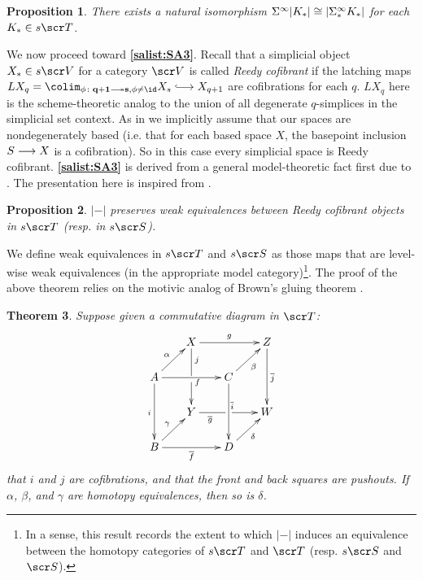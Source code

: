 \documentclass{amsart}
\newtheorem{thm}{Theorem}[section]
\newtheorem{prop}[thm]{Proposition}
\theoremstyle{definition}
\begin{document}
\begin{prop}\label{prop:3.2}
There exists a natural isomorphism $\Sigma^{\infty}|K_*| \cong |\Sigma^{\infty}_*K_*|$ for each $K_* \in s\sT$.
\end{prop}

We now proceed toward \textbf{\ref{salist:SA3}}. Recall that a simplicial object $X_* \in s\sV$ for a category $\sV$ is called \emph{Reedy cofibrant} if the latching maps $LX_q = \colim_{\phi \colon \mathbf{q+1} \epito \mathbf{s}, \phi \neq \id} X_s \monoto X_{q+1}$ are cofibrations for each $q$. $LX_q$ here is the scheme-theoretic analog to the union of all degenerate $q$-simplices in the simplicial set context. As in \cite{May09Einfty} we implicitly assume that our spaces are nondegenerately based (i.e. that for each based space $X$, the basepoint inclusion $S \longrightarrow X$ is a cofibration). So in this case every simplicial space is Reedy cofibrant.
\textbf{\ref{salist:SA3}} is derived from a general model-theoretic fact first due to \cite{reedy73}. The presentation here is inspired from \cite{may74perm}. 

\begin{prop}
$|-|$ preserves weak equivalences between Reedy cofibrant objects in $s\sT$ (resp. in $s\sS$).
\end{prop}

We define weak equivalences in $s\sT$ and $s\sS$ as those maps that are level-wise weak equivalences (in the appropriate model category)\footnote{In a sense, this result records the extent to which $|-|$ induces an equivalence between the homotopy categories of $s\sT$ and $\sT$ (resp. $s\sS$ and $\sS$).}. The proof of the above theorem relies on the motivic analog of Brown's gluing theorem \cite[Theorem 7.5.7]{Brown06topgrp}.

\begin{thm}\label{thm:3.1}
Suppose given a commutative diagram in $\sT$:
\[\xymatrix@-0.5pc{
& X \ar[rr]^g \ar '[d]^j [dd]^<f & & Z \ar[dd]^{\overline{j}}\\
A \ar[dd]_{i} \ar[rr] \ar[ur]^{\alpha} &  & C \ar[dd] \ar[ur]_{\beta} &\\
& Y \ar '[r]_{\overline{g}} [rr]^<{\overline{i}} & & W\\
B \ar[ur]^{\ga} \ar[rr]_{\overline{f}} & & D \ar[ur]_{\delta} &
}\]
\noindent that $i$ and $j$ are cofibrations, and that the front and back squares are pushouts. If $\alpha$, $\beta$, and $\gamma$ are homotopy equivalences, then so is $\delta$.
\end{thm}
\end{document}
